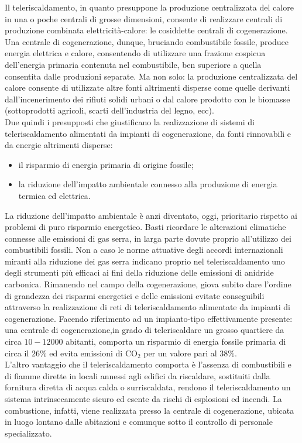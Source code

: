 \documentclass[laurea,oneside,11pt]{USiena_tesiLM}
\begin{document}
Il teleriscaldamento, in quanto presuppone la produzione centralizzata del calore in una o poche centrali di grosse dimensioni, consente di realizzare centrali di produzione combinata elettricità-calore: le cosiddette  centrali di cogenerazione.
Una centrale di cogenerazione, dunque, bruciando combustibile fossile, produce energia elettrica e calore, consentendo di utilizzare una frazione cospicua dell'energia primaria contenuta nel combustibile, ben superiore a quella consentita dalle produzioni separate.
Ma non solo: la produzione centralizzata del calore consente di utilizzate altre fonti altrimenti disperse come quelle derivanti dall'incenerimento dei rifiuti solidi urbani o dal calore prodotto con le biomasse (sottoprodotti agricoli, scarti dell'industria del legno, ecc).\\

Due quindi i presupposti che giustificano la realizzazione di sistemi di teleriscaldamento alimentati da impianti di cogenerazione, da fonti rinnovabili e da energie altrimenti disperse:
\begin{itemize}
\item il risparmio di energia primaria di origine fossile;
\item la riduzione dell'impatto ambientale connesso alla produzione di energia termica ed elettrica.
\end{itemize}
La riduzione dell'impatto ambientale è anzi diventato, oggi, prioritario rispetto ai problemi di puro risparmio energetico. Basti ricordare le alterazioni climatiche connesse alle emissioni di gas serra, in larga parte dovute proprio all'utilizzo dei combustibili fossili. Non a caso le norme attuative degli accordi internazionali miranti alla riduzione dei gas serra indicano proprio nel teleriscaldamento uno degli strumenti più efficaci ai fini della riduzione delle emissioni di anidride carbonica.
Rimanendo nel campo della cogenerazione, giova subito dare l'ordine di grandezza dei risparmi energetici e delle emissioni evitate conseguibili attraverso la realizzazione di reti di teleriscaldamento alimentate da impianti di cogenerazione.
Facendo riferimento ad un impianto-tipo effettivamente presente: una centrale di cogenerazione,in grado di teleriscaldare un grosso quartiere da circa $10-12000$ abitanti, comporta un risparmio di energia fossile primaria di circa il $26\%$ ed evita emissioni di CO$_2$ per un valore pari al $38\%$.\\

L'altro vantaggio che il teleriscaldamento comporta è l'assenza di combustibili e di fiamme dirette in locali annessi agli edifici da riscaldare, sostituiti dalla fornitura diretta di acqua calda o surriscaldata, rendono il teleriscaldamento un sistema intrinsecamente sicuro ed esente da rischi di esplosioni ed incendi.
La combustione, infatti, viene realizzata presso la centrale di cogenerazione, ubicata in luogo lontano dalle abitazioni e comunque sotto il controllo di personale specializzato.
\end{document}
